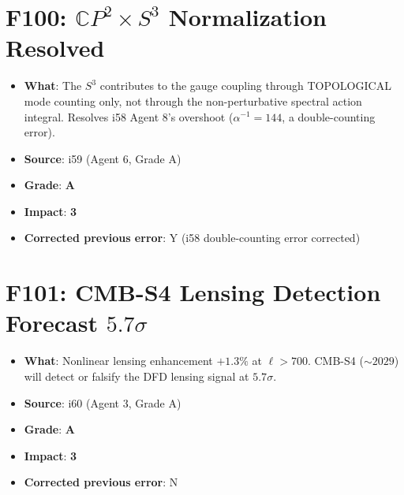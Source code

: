 \documentclass[11pt,a4paper]{article}
\newcommand{\grade}[1]{\textbf{#1}}
\newcommand{\impact}[1]{\textbf{#1}}
\begin{document}
\section{F100: $\mathbb{C}P^2 \times S^3$ Normalization Resolved}
\begin{itemize}[nosep]
\item \textbf{What}: The $S^3$ contributes to the gauge coupling through TOPOLOGICAL mode counting only, not through the non-perturbative spectral action integral. Resolves i58 Agent 8's overshoot ($\alpha^{-1} = 144$, a double-counting error).
\item \textbf{Source}: i59 (Agent 6, Grade A)
\item \textbf{Grade}: \grade{A}
\item \textbf{Impact}: \impact{3}
\item \textbf{Corrected previous error}: Y (i58 double-counting error corrected)
\end{itemize}

\section{F101: CMB-S4 Lensing Detection Forecast $5.7\sigma$}
\begin{itemize}[nosep]
\item \textbf{What}: Nonlinear lensing enhancement $+1.3\%$ at $\ell > 700$. CMB-S4 ($\sim 2029$) will detect or falsify the DFD lensing signal at $5.7\sigma$.
\item \textbf{Source}: i60 (Agent 3, Grade A)
\item \textbf{Grade}: \grade{A}
\item \textbf{Impact}: \impact{3}
\item \textbf{Corrected previous error}: N
\end{itemize}

\end{document}
